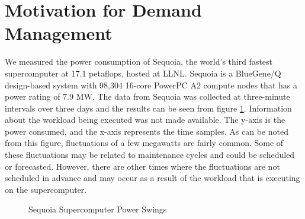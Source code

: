 \section{Motivation for Demand Management}
\label{strategies}
We measured the power consumption of Sequoia, the world's third fastest supercomputer at 17.1 petaflops, hosted at LLNL. Sequoia is a BlueGene/Q design-based system with 98,304 16-core PowerPC A2 compute nodes that has a power rating of 7.9 MW. The data from Sequoia was collected at three-minute intervals over three days and the results can be seen from figure \ref{fig:seq}. Information about the workload being executed was not made available. The y-axis is the power consumed, and the x-axis represents the time samples.  As can be noted from this figure, fluctuations of a few megawatts are fairly common. Some of these fluctuations may be related to maintenance cycles and could be scheduled or forecasted. However, there are other times where the fluctuations are not scheduled in advance and may occur as a result of the workload that is executing on the supercomputer. \\

\begin{figure}
\begin{center}
\caption{Sequoia Supercomputer Power Swings}
\label{fig:seq}
\end{center}
\end{figure}

